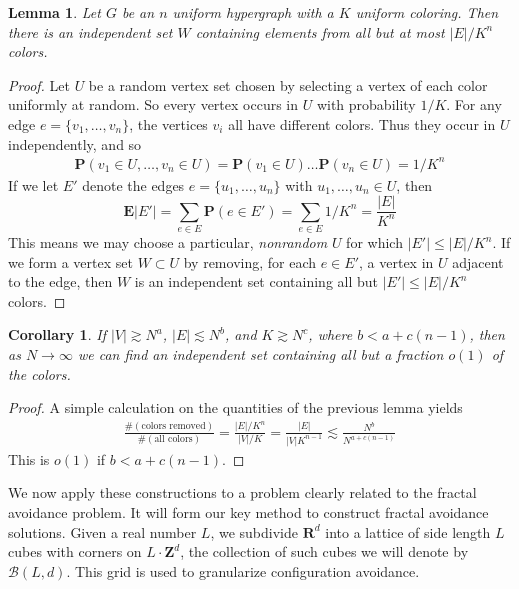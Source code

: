 \documentclass{article}
\theoremstyle{plain}
\newtheorem{lemma}{Lemma}
\newtheorem*{corollary}{Corollary}
\theoremstyle{plain}
\begin{document}
\begin{multicols}{2}
\begin{lemma}
	Let $G$ be an $n$ uniform hypergraph with a $K$ uniform coloring. Then there is an independent set $W$ containing elements from all but at most $|E|/K^n$ colors.
\end{lemma}
\begin{proof}
	Let $U$ be a random vertex set chosen by selecting a vertex of each color uniformly at random. So every vertex occurs in $U$ with probability $1/K$. For any edge $e = \{ v_1, \dots, v_n \}$, the vertices $v_i$ all have different colors. Thus they occur in $U$ independently, and so
	\begin{align*}
		\mathbf{P}(v_1 \in U, \dots, v_n \in U) = \mathbf{P}(v_1 \in U) \dots \mathbf{P}(v_n \in U) = 1/K^n
	\end{align*}
	If we let $E'$ denote the edges $e = \{ u_1, \dots, u_n \}$ with $u_1, \dots, u_n \in U$, then
	\[ \mathbf{E}|E'| = \sum_{e \in E} \mathbf{P}(e \in E') = \sum_{e \in E} 1/K^n = \frac{|E|}{K^n} \]
	This means we may choose a particular, {\it nonrandom} $U$ for which $|E'| \leq |E|/K^n$. If we form a vertex set $W \subset U$ by removing, for each $e \in E'$, a vertex in $U$ adjacent to the edge, then $W$ is an independent set containing all but $|E'| \leq |E|/K^n$ colors.
\end{proof}

\begin{corollary}
	If $|V| \gtrsim N^a$, $|E| \lesssim N^b$, and $K \gtrsim N^c$, where $b < a + c(n-1)$, then as $N \to \infty$ we can find an independent set containing all but a fraction $o(1)$ of the colors.
\end{corollary}
\begin{proof}
	A simple calculation on the quantities of the previous lemma yields
	\begin{align*}
		\frac{\# ( \text{colors removed} )}{\# ( \text{all colors} )} = \frac{|E|/K^n}{|V|/K} = \frac{|E|}{|V|K^{n-1}} \lesssim \frac{N^b}{N^{a + c(n-1)}}
	\end{align*}
	This is $o(1)$ if $b < a + c(n-1)$.
\end{proof}

We now apply these constructions to a problem clearly related to the fractal avoidance problem. It will form our key method to construct fractal avoidance solutions. Given a real number $L$, we subdivide $\mathbf{R}^d$ into a lattice of side length $L$ cubes with corners on $L \cdot \mathbf{Z}^d$, the collection of such cubes we will denote by $\mathcal{B}(L,d)$. This grid is used to granularize configuration avoidance.


\end{multicols}
\end{document}
